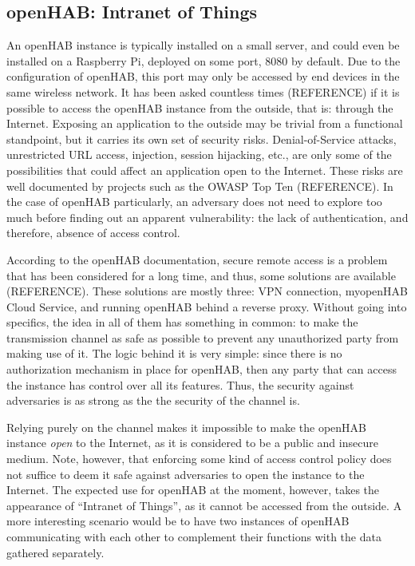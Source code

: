 \documentclass[12pt]{article}
\newcommand{\TODO}{\todo[inline]}
\begin{document}
\subsection{openHAB: Intranet of Things}

\TODO{REFERENCES}
An openHAB instance is typically installed on a small server, and could even be installed on a Raspberry Pi, deployed on some port, 8080 by default. Due to the configuration of openHAB, this port may only be accessed by end devices in the same wireless network. It has been asked countless times (REFERENCE) if it is possible to access the openHAB instance from the outside, that is: through the Internet. Exposing an application to the outside may be trivial from a functional standpoint, but it carries its own set of security risks. Denial-of-Service attacks, unrestricted URL access, injection, session hijacking, etc., are only some of the possibilities that could affect an application open to the Internet. These risks are well documented by projects such as the OWASP Top Ten (REFERENCE). In the case of openHAB particularly, an adversary does not need to explore too much before finding out an apparent vulnerability: the lack of authentication, and therefore, absence of access control.

According to the openHAB documentation, secure remote access is a problem that has been considered for a long time, and thus, some solutions are available (REFERENCE). These solutions are mostly three: VPN connection, myopenHAB Cloud Service, and running openHAB behind a reverse proxy. Without going into specifics, the idea in all of them has something in common: to make the transmission channel as safe as possible to prevent any unauthorized party from making use of it. The logic behind it is very simple: since there is no authorization mechanism in place for openHAB, then any party that can access the instance has control over all its features. Thus, the security against adversaries is as strong as the the security of the channel is.

Relying purely on the channel makes it impossible to make the openHAB instance \emph{open} to the Internet, as it is considered to  be a public and insecure medium. Note, however, that enforcing some kind of access control policy does not suffice to deem it safe against adversaries to open the instance to the Internet. The expected use for openHAB at the moment, however, takes the appearance of ``Intranet of Things'', as it cannot be accessed from the outside. A more interesting scenario would be to have two instances of openHAB communicating with each other to complement their functions with the data gathered separately.
\end{document}
